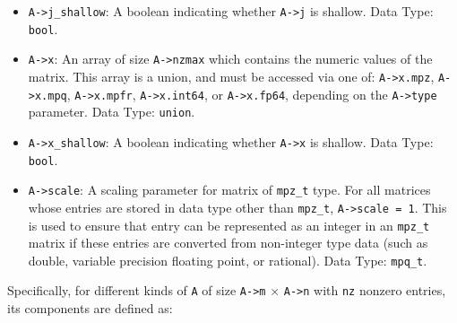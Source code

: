 \documentclass[12pt]{report}
\theoremstyle{definition}
\begin{document}
\begin{itemize}
\item \verb|A->j_shallow|: A boolean indicating whether \verb|A->j| is shallow.
Data Type: \verb|bool|.

\item \verb|A->x|: An array of size \verb|A->nzmax| which contains the
numeric values of the matrix.  This array is a union, and must be accessed via
one of: \verb|A->x.mpz|, \verb|A->x.mpq|, \verb|A->x.mpfr|, \verb|A->x.int64|,
or \verb|A->x.fp64|, depending on the \verb|A->type| parameter.
Data Type: \verb|union|.

\item \verb|A->x_shallow|: A boolean indicating whether \verb|A->x| is
shallow. Data Type: \verb|bool|.

\item \verb|A->scale|: A scaling parameter for matrix of \verb|mpz_t| type. For
all matrices whose entries are stored in data type other than \verb|mpz_t|,
\verb|A->scale = 1|. This is used to ensure that entry can be represented as an
integer in an \verb|mpz_t| matrix if these entries are converted from non-integer type
data (such as double, variable precision floating point, or rational). Data
Type: \verb|mpq_t|.

\end{itemize}

Specifically, for different kinds of \verb|A| of size \verb|A->m| $\times$ \verb|A->n|
with \verb|nz| nonzero entries, its components are defined as:
\end{document}
